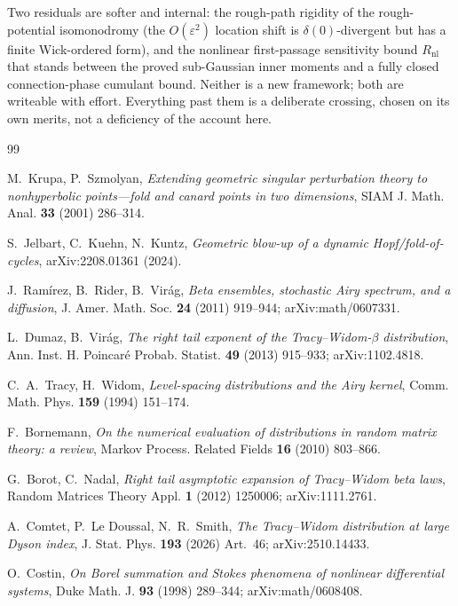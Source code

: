 \documentclass[11pt,reqno]{amsart}
\theoremstyle{plain}
\theoremstyle{definition}
\theoremstyle{remark}
\newcommand{\eps}{\varepsilon}
\begin{document}
Two residuals are softer and internal: the rough-path rigidity of the rough-potential isomonodromy
(the $O(\eps^2)$ location shift is $\delta(0)$-divergent but has a finite Wick-ordered form), and the
nonlinear first-passage sensitivity bound $R_{\mathrm{nl}}$ that stands between the proved
sub-Gaussian inner moments and a fully closed connection-phase cumulant bound. Neither is a new
framework; both are writeable with effort. Everything past them is a deliberate crossing, chosen on
its own merits, not a deficiency of the account here.

\begin{thebibliography}{99}

 M.~Krupa, P.~Szmolyan, \emph{Extending geometric singular perturbation theory to
nonhyperbolic points---fold and canard points in two dimensions}, SIAM J. Math. Anal. \textbf{33}
(2001) 286--314.

 S.~Jelbart, C.~Kuehn, N.~Kuntz, \emph{Geometric blow-up of a dynamic
Hopf/fold-of-cycles}, arXiv:2208.01361 (2024).

 J.~Ram\'irez, B.~Rider, B.~Vir\'ag, \emph{Beta ensembles, stochastic Airy spectrum,
and a diffusion}, J. Amer. Math. Soc. \textbf{24} (2011) 919--944; arXiv:math/0607331.

 L.~Dumaz, B.~Vir\'ag, \emph{The right tail exponent of the Tracy--Widom-$\beta$
distribution}, Ann. Inst. H. Poincar\'e Probab. Statist. \textbf{49} (2013) 915--933; arXiv:1102.4818.

 C.~A.~Tracy, H.~Widom, \emph{Level-spacing distributions and the Airy kernel},
Comm. Math. Phys. \textbf{159} (1994) 151--174.

 F.~Bornemann, \emph{On the numerical evaluation of distributions in random
matrix theory: a review}, Markov Process. Related Fields \textbf{16} (2010) 803--866.

 G.~Borot, C.~Nadal, \emph{Right tail asymptotic expansion of Tracy--Widom beta
laws}, Random Matrices Theory Appl. \textbf{1} (2012) 1250006; arXiv:1111.2761.

 A.~Comtet, P.~Le Doussal, N.~R.~Smith, \emph{The Tracy--Widom distribution at large
Dyson index}, J. Stat. Phys. \textbf{193} (2026) Art.~46; arXiv:2510.14433.

 O.~Costin, \emph{On Borel summation and Stokes phenomena of nonlinear differential
systems}, Duke Math. J. \textbf{93} (1998) 289--344; arXiv:math/0608408.


\end{thebibliography}
\end{document}
